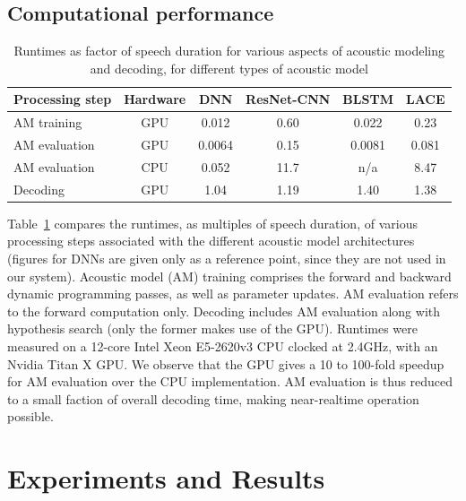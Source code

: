 \documentclass{article}
\begin{document}
\subsection{Computational performance}
\begin{table}
	\centering
	\caption{Runtimes as factor of speech duration for various aspects of acoustic modeling and decoding,
		for different types of acoustic model}
	\label{tab:runtimes}
	\begin{tabular}{|l|c|c|c|c|c|}
	\hline
	Processing step		& Hardware	& DNN		& ResNet-CNN	& BLSTM		& LACE	\\
	\hline \hline
	AM training		& GPU		& 0.012		& 0.60		& 0.022		& 0.23	\\
	\hline
	AM evaluation		& GPU		& 0.0064	& 0.15		& 0.0081	& 0.081	\\
	\hline
	AM evaluation		& CPU		& 0.052		& 11.7		& n/a		& 8.47	\\
	\hline
	Decoding		& GPU		& 1.04		& 1.19		& 1.40		& 1.38	\\
	\hline
	\end{tabular}
\end{table}
Table~\ref{tab:runtimes} compares the runtimes, as multiples of speech duration, of various processing steps
associated with the different acoustic model architectures
(figures for DNNs are given only as a reference point, since they are not used in our system).
Acoustic model (AM) training comprises the forward and backward dynamic programming passes, as well as parameter updates.
AM evaluation refers to the forward computation only.
Decoding includes AM evaluation along with hypothesis search (only the former makes use of the GPU).
Runtimes were measured on a 12-core Intel Xeon E5-2620v3 CPU clocked at 2.4GHz, with an Nvidia Titan X GPU.
We observe that the GPU gives a 10 to 100-fold speedup for AM evaluation over the CPU implementation.
AM evaluation is thus reduced to a small faction of overall decoding time, making near-realtime operation possible.
\section{Experiments and Results}
\label{sec:results}
\end{document}
